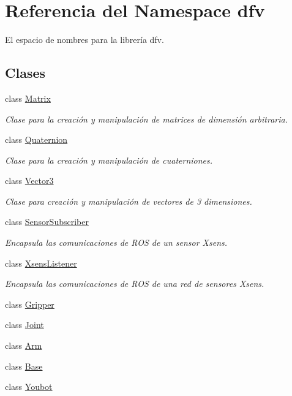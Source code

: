 \hypertarget{namespacedfv}{\section{\-Referencia del \-Namespace dfv}
\label{namespacedfv}
}


\-El espacio de nombres para la librería dfv.  


\subsection*{\-Clases}
\begin{DoxyCompactItemize}
\item 
class \hyperlink{classdfv_1_1Matrix}{\-Matrix}
\begin{DoxyCompactList}\small\item\em \-Clase para la creación y manipulación de matrices de dimensión arbitraria. \end{DoxyCompactList}\item 
class \hyperlink{classdfv_1_1Quaternion}{\-Quaternion}
\begin{DoxyCompactList}\small\item\em \-Clase para la creación y manipulación de cuaterniones. \end{DoxyCompactList}\item 
class \hyperlink{classdfv_1_1Vector3}{\-Vector3}
\begin{DoxyCompactList}\small\item\em \-Clase para creación y manipulación de vectores de 3 dimensiones. \end{DoxyCompactList}\item 
class \hyperlink{classdfv_1_1SensorSubscriber}{\-Sensor\-Subscriber}
\begin{DoxyCompactList}\small\item\em \-Encapsula las comunicaciones de \-R\-O\-S de un sensor \-Xsens. \end{DoxyCompactList}\item 
class \hyperlink{classdfv_1_1XsensListener}{\-Xsens\-Listener}
\begin{DoxyCompactList}\small\item\em \-Encapsula las comunicaciones de \-R\-O\-S de una red de sensores \-Xsens. \end{DoxyCompactList}\item 
class \hyperlink{classdfv_1_1Gripper}{\-Gripper}
\item 
class \hyperlink{classdfv_1_1Joint}{\-Joint}
\item 
class \hyperlink{classdfv_1_1Arm}{\-Arm}
\item 
class \hyperlink{classdfv_1_1Base}{\-Base}
\item 
class \hyperlink{classdfv_1_1Youbot}{\-Youbot}
\end{DoxyCompactItemize}
